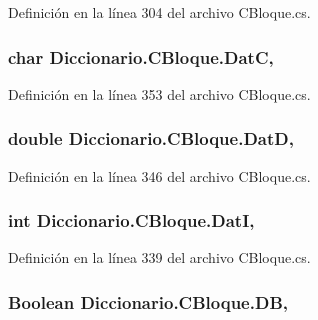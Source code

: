 Definición en la línea 304 del archivo C\-Bloque.\-cs.

\hypertarget{class_diccionario_1_1_c_bloque_a90dfda6024e7a577a798b676b7252614}{
\subsubsection[{Dat\-C}]{\setlength{\rightskip}{0pt plus 5cm}char Diccionario.\-C\-Bloque.\-Dat\-C\hspace{0.3cm}{\ttfamily [get]}, {\ttfamily [set]}}}\label{class_diccionario_1_1_c_bloque_a90dfda6024e7a577a798b676b7252614}


Definición en la línea 353 del archivo C\-Bloque.\-cs.

\hypertarget{class_diccionario_1_1_c_bloque_a77533fcb768b666e21abd49a73cde141}{
\subsubsection[{Dat\-D}]{\setlength{\rightskip}{0pt plus 5cm}double Diccionario.\-C\-Bloque.\-Dat\-D\hspace{0.3cm}{\ttfamily [get]}, {\ttfamily [set]}}}\label{class_diccionario_1_1_c_bloque_a77533fcb768b666e21abd49a73cde141}


Definición en la línea 346 del archivo C\-Bloque.\-cs.

\hypertarget{class_diccionario_1_1_c_bloque_a03ee90760981332925486654c511f933}{
\subsubsection[{Dat\-I}]{\setlength{\rightskip}{0pt plus 5cm}int Diccionario.\-C\-Bloque.\-Dat\-I\hspace{0.3cm}{\ttfamily [get]}, {\ttfamily [set]}}}\label{class_diccionario_1_1_c_bloque_a03ee90760981332925486654c511f933}


Definición en la línea 339 del archivo C\-Bloque.\-cs.

\hypertarget{class_diccionario_1_1_c_bloque_a97d96532b219efeeb2273b391ac3c865}{
\subsubsection[{D\-B}]{\setlength{\rightskip}{0pt plus 5cm}Boolean Diccionario.\-C\-Bloque.\-D\-B\hspace{0.3cm}{\ttfamily [get]}, {\ttfamily [set]}}}\label{class_diccionario_1_1_c_bloque_a97d96532b219efeeb2273b391ac3c865}


